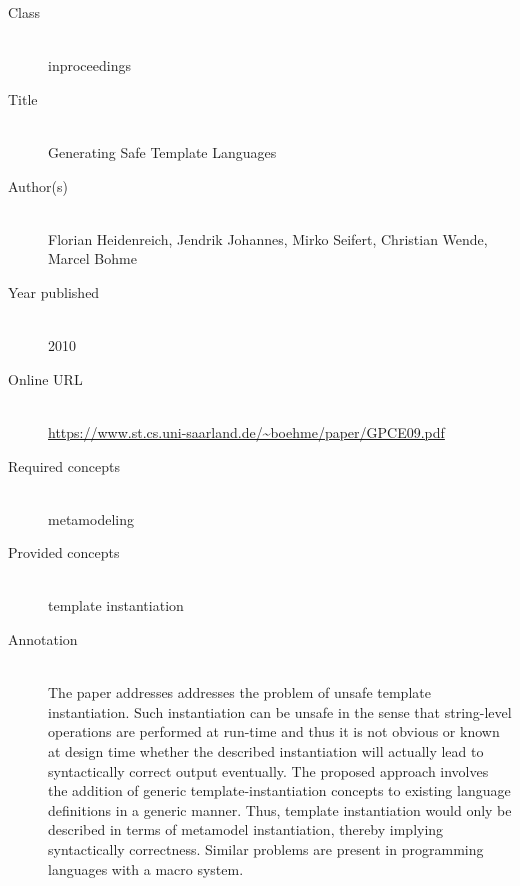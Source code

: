 \begin{description}
\item[Class]\mbox{}\\
inproceedings
\item[Title]\mbox{}\\
Generating Safe Template Languages
\item[Author(s)]\mbox{}\\
Florian Heidenreich, Jendrik Johannes, Mirko Seifert, Christian Wende, Marcel Bohme\item[Year published]\mbox{}\\
2010
\item[Online URL]\mbox{}\\
{\footnotesize\url{https://www.st.cs.uni-saarland.de/~boehme/paper/GPCE09.pdf}}
\item[Required concepts]\mbox{}\\
metamodeling\item[Provided concepts]\mbox{}\\
template instantiation\item[Annotation]\mbox{}\\
The paper addresses addresses the problem of unsafe template instantiation. Such instantiation can be unsafe in the sense that string-level operations are performed at run-time and thus it is not obvious or known at design time whether the described instantiation will actually lead to syntactically correct output eventually. The proposed approach involves the addition of generic template-instantiation concepts to existing language definitions in a generic manner. Thus, template instantiation would only be described in terms of metamodel instantiation, thereby implying syntactically correctness. Similar problems are present in programming languages with a macro system.
\end{description}

